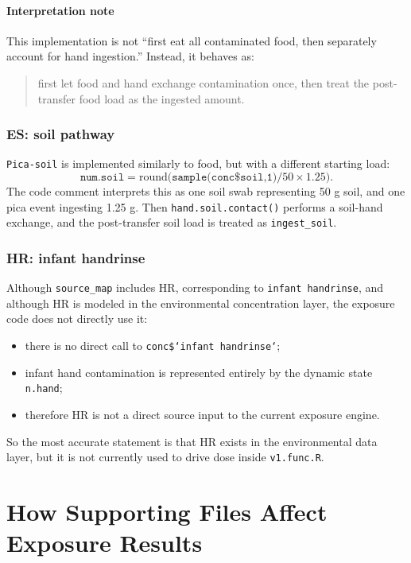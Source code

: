 \documentclass[11pt]{article}
\begin{document}
\paragraph{Interpretation note}
This implementation is not ``first eat all contaminated food, then separately account for hand ingestion.'' Instead, it behaves as:
\begin{quote}
first let food and hand exchange contamination once, then treat the post-transfer food load as the ingested amount.
\end{quote}

\subsubsection*{ES: soil pathway}
\texttt{Pica-soil} is implemented similarly to food, but with a different starting load:
\[
\texttt{num.soil}
=
\mathrm{round}\bigl(\texttt{sample(conc\$soil,1)}/50 \times 1.25\bigr).
\]
The code comment interprets this as one soil swab representing 50 g soil, and one pica event ingesting 1.25 g. Then \texttt{hand.soil.contact()} performs a soil-hand exchange, and the post-transfer soil load is treated as \texttt{ingest\_soil}.

\subsubsection*{HR: infant handrinse}
Although \texttt{source\_map} includes HR, corresponding to \texttt{infant handrinse}, and although HR is modeled in the environmental concentration layer, the exposure code does not directly use it:
\begin{itemize}[leftmargin=2em]
  \item there is no direct call to \texttt{conc\$`infant handrinse`};
  \item infant hand contamination is represented entirely by the dynamic state \texttt{n.hand};
  \item therefore HR is not a direct source input to the current exposure engine.
\end{itemize}
So the most accurate statement is that HR exists in the environmental data layer, but it is not currently used to drive dose inside \texttt{v1.func.R}.

\section{How Supporting Files Affect Exposure Results}
\end{document}
